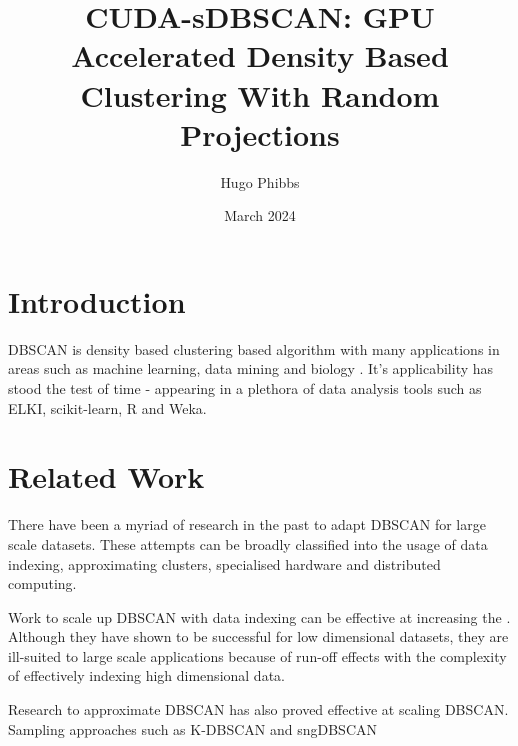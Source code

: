\documentclass{article}
\title{CUDA-sDBSCAN: GPU Accelerated Density Based Clustering With Random Projections}
\author{   
    Hugo Phibbs %
}
\date{March 2024} %
\begin{document}
\maketitle

\begin{abstract}
    
\end{abstract}

\section{Introduction}	
DBSCAN \cite{DB_SCAN_1996} is density based clustering based algorithm with many applications in areas such as machine learning, data mining and biology \cite{campello_density-based_2020}. It's applicability has stood the test of time - appearing in a plethora of data analysis tools such as ELKI, scikit-learn, R and Weka.


\section{Related Work}

There have been a myriad of research in the past to adapt DBSCAN for large scale datasets. These attempts can be broadly classified into the usage of data indexing, approximating clusters, specialised hardware and distributed computing.

Work to scale up DBSCAN with data indexing \cite{ohadi_sw_dbscan_2020, huang_grit-dbscan_2022}  can be effective at increasing the . Although they have shown to be successful for low dimensional datasets, they are ill-suited to large scale applications because of run-off effects with the complexity of effectively indexing high dimensional data. 

Research to approximate DBSCAN \cite{S_DBSCAN, schneider_scalable_2017, jiang_faster_2020} has also proved effective at scaling DBSCAN. Sampling approaches such as K-DBSCAN \cite{gholizadeh_k-dbscan_2021} and sngDBSCAN \cite{jiang_faster_2020} 
\end{document}
